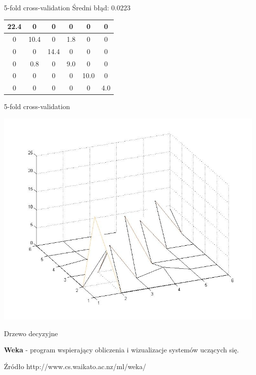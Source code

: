 \documentclass{beamer}
\begin{document}
\begin{frame}{5-fold cross-validation}
 Średni błąd: 0.0223
\vspace{0.5cm}

\begin{center}
{\LARGE 
\begin{tabular}{ | c | c | c | c | c | c |}
\hline
   22.4  &       0  &       0  &       0 &        0  &       0 \\ \hline
         0  & 10.4  &       0  &  1.8 &        0  &       0 \\ \hline
         0  &       0  & 14.4  &       0 &        0  &       0 \\ \hline
         0  &  0.8  &       0  &  9.0 &        0  &       0 \\ \hline
         0  &       0  &       0  &       0 &  10.0  &       0 \\ \hline
         0  &       0  &       0  &       0 &        0  &  4.0 \\ \hline
\end{tabular}
}
\end{center}
\end{frame}

\begin{frame}{5-fold cross-validation}
\begin{center}
  \includegraphics[scale=0.35]{img/mp_mesh.jpg}  
\end{center}
\end{frame}

\begin{frame}{Drzewo decyzyjne}

 {\bf Weka} - program wspierający obliczenia i wizualizacje systemów uczących się.

\vspace{0.5cm}

\begin{block}{Źródło}
http://www.cs.waikato.ac.nz/ml/weka/
\end{block}
\end{frame}
\end{document}
